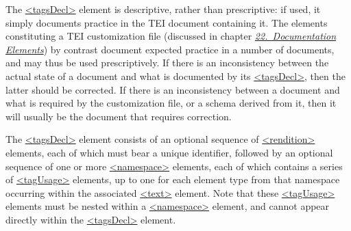 \par
The \hyperref[TEI.tagsDecl]{<tagsDecl>} element is descriptive, rather than prescriptive: if used, it simply documents practice in the TEI document containing it. The elements constituting a TEI customization file (discussed in chapter \textit{\hyperref[TD]{22.\ Documentation Elements}}) by contrast document expected practice in a number of documents, and may thus be used prescriptively. If there is an inconsistency between the actual state of a document and what is documented by its \hyperref[TEI.tagsDecl]{<tagsDecl>}, then the latter should be corrected. If there is an inconsistency between a document and what is required by the customization file, or a schema derived from it, then it will usually be the document that requires correction.\par
The \hyperref[TEI.tagsDecl]{<tagsDecl>} element consists of an optional sequence of \hyperref[TEI.rendition]{<rendition>} elements, each of which must bear a unique identifier, followed by an optional sequence of one or more \hyperref[TEI.namespace]{<namespace>} elements, each of which contains a series of \hyperref[TEI.tagUsage]{<tagUsage>} elements, up to one for each element type from that namespace occurring within the associated \hyperref[TEI.text]{<text>} element. Note that these \hyperref[TEI.tagUsage]{<tagUsage>} elements must be nested within a \hyperref[TEI.namespace]{<namespace>} element, and cannot appear directly within the \hyperref[TEI.tagsDecl]{<tagsDecl>} element.
